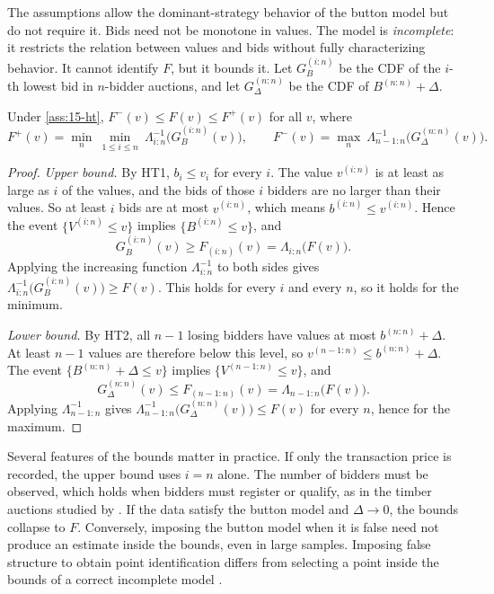 The assumptions allow the dominant-strategy behavior of the button model but do not require it. Bids need not be
monotone in values. The model is \emph{incomplete}: it restricts the relation between values and bids without fully
characterizing behavior. It cannot identify $F$, but it bounds it. Let $G_B^{(i:n)}$ be the CDF of the $i$-th lowest
bid in $n$-bidder auctions, and let $G_\Delta^{(n:n)}$ be the CDF of $B^{(n:n)}+\Delta$.

\begin{theorem}\label{thm:15-ht}
Under \cref{ass:15-ht}, $F^-(v)\le F(v)\le F^+(v)$ for all $v$, where
\[
F^+(v)=\min_{n}\ \min_{1\le i\le n}\ \Lambda_{i:n}^{-1}\big(G_B^{(i:n)}(v)\big),\qquad
F^-(v)=\max_{n}\ \Lambda_{n-1:n}^{-1}\big(G_\Delta^{(n:n)}(v)\big).
\]
\end{theorem}

\begin{proof}
\emph{Upper bound.} By HT1, $b_i\le v_i$ for every $i$. The value $v^{(i:n)}$ is at least as large as $i$ of the
values, and the bids of those $i$ bidders are no larger than their values. So at least $i$ bids are at most
$v^{(i:n)}$, which means $b^{(i:n)}\le v^{(i:n)}$. Hence the event $\{V^{(i:n)}\le v\}$ implies $\{B^{(i:n)}\le v\}$,
and
\[
G_B^{(i:n)}(v)\ge F_{(i:n)}(v)=\Lambda_{i:n}\big(F(v)\big).
\]
Applying the increasing function $\Lambda_{i:n}^{-1}$ to both sides gives $\Lambda_{i:n}^{-1}\big(G_B^{(i:n)}(v)\big)\ge F(v)$.
This holds for every $i$ and every $n$, so it holds for the minimum.

\emph{Lower bound.} By HT2, all $n-1$ losing bidders have values at most $b^{(n:n)}+\Delta$. At least $n-1$ values are
therefore below this level, so $v^{(n-1:n)}\le b^{(n:n)}+\Delta$. The event $\{B^{(n:n)}+\Delta\le v\}$ implies
$\{V^{(n-1:n)}\le v\}$, and
\[
G_\Delta^{(n:n)}(v)\le F_{(n-1:n)}(v)=\Lambda_{n-1:n}\big(F(v)\big).
\]
Applying $\Lambda_{n-1:n}^{-1}$ gives $\Lambda_{n-1:n}^{-1}\big(G_\Delta^{(n:n)}(v)\big)\le F(v)$ for every $n$, hence for the
maximum.
\end{proof}

Several features of the bounds matter in practice. If only the transaction price is recorded, the upper bound uses
$i=n$ alone. The number of bidders must be observed, which holds when bidders must register or qualify, as in the
timber auctions studied by \citet{HaileTamer2003}. If the data satisfy the button model and $\Delta\to0$, the bounds
collapse to $F$. Conversely, imposing the button model when it is false need not produce an estimate inside the
bounds, even in large samples. Imposing false structure to obtain point identification differs from selecting a
point inside the bounds of a correct incomplete model \citep[Section~4.3.1]{AtheyHaile2007}.

